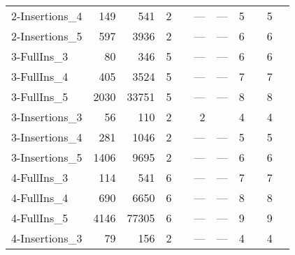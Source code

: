 \begin{longtable}{lrrrlrlrlrl}
  2-Insertions\_4 & 149 & 541 & 2 & \cite{Malaguti2011} & --- & --- & 5 & \cite{Malaguti2010} & 5 & \cite{Malaguti2010} \\ 
  2-Insertions\_5 & 597 & 3936 & 2 & \cite{Malaguti2011} & --- & --- & 6 & \cite{Malaguti2010} & 6 & \cite{Malaguti2010} \\ 
  3-FullIns\_3 & 80 & 346 & 5 & \cite{Malaguti2011} & --- & --- & 6 & \cite{Mendez-Diaz2006,Mendez-Diaz2008,Malaguti2011,Gualandi2012} & 6 & \cite{Mendez-Diaz2006,Malaguti2011,Gualandi2012,Mendez-Diaz2006,Brelaz1979,Sewell1996,Segundo2012} \\ 
  3-FullIns\_4 & 405 & 3524 & 5 & \cite{us} & --- & --- & 7 & \cite{Mendez-Diaz2006} & 7 & \cite{Mendez-Diaz2006,Malaguti2011,Gualandi2012,Mendez-Diaz2006,Brelaz1979,Sewell1996,Segundo2012} \\ 
  3-FullIns\_5 & 2030 & 33751 & 5 & \cite{us} & --- & --- & 8 & \cite{Malaguti2010} & 8 & \cite{Mendez-Diaz2006,Malaguti2010,Malaguti2011,Brelaz1979,Sewell1996,Segundo2012} \\ 
  3-Insertions\_3 & 56 & 110 & 2 & \cite{Malaguti2011} & 2 & \cite{Gualandi2012} & 4 & \cite{Mendez-Diaz2006,Caramia,Gualandi2012} & 4 & \cite{Mendez-Diaz2006,Caramia,Malaguti2011,Gualandi2012,Brelaz1979,Sewell1996,Segundo2012} \\ 
  3-Insertions\_4 & 281 & 1046 & 2 & \cite{Malaguti2011} & --- & --- & 5 & \cite{Malaguti2010} & 5 & \cite{Malaguti2010,Mendez-Diaz2006,Malaguti2011,Gualandi2012,Brelaz1979,Sewell1996,Segundo2012} \\ 
  3-Insertions\_5 & 1406 & 9695 & 2 & \cite{Malaguti2011,Held2011} & --- & --- & 6 & \cite{Malaguti2010} & 6 & \cite{Mendez-Diaz2006,Malaguti2011,Gualandi2012,Brelaz1979,Sewell1996,Segundo2012} \\ 
  4-FullIns\_3 & 114 & 541 & 6 & \cite{us} & --- & --- & 7 & \cite{Mendez-Diaz2006,Malaguti2011,Gualandi2012} & 7 & \cite{Mendez-Diaz2006,Malaguti2011,Gualandi2012,Brelaz1979,Sewell1996,Segundo2012} \\ 
  4-FullIns\_4 & 690 & 6650 & 6 & \cite{us} & --- & --- & 8 & \cite{Malaguti2010} & 8 & \cite{Mendez-Diaz2006,Malaguti2010,Malaguti2011,Gualandi2012,Brelaz1979,Sewell1996,Segundo2012} \\ 
  4-FullIns\_5 & 4146 & 77305 & 6 & \cite{us} & --- & --- & 9 & \cite{Gliesch2021} & 9 & \cite{Mendez-Diaz2006,Malaguti2011,Brelaz1979,Sewell1996,Segundo2012} \\ 
  4-Insertions\_3 & 79 & 156 & 2 & \cite{Malaguti2011} & --- & --- & 4 & \cite{Malaguti2010} & 4 & \cite{Malaguti2010,Mendez-Diaz2006,Malaguti2011,Gualandi2012,Brelaz1979,Sewell1996,Segundo2012} \\ 

\end{longtable}
